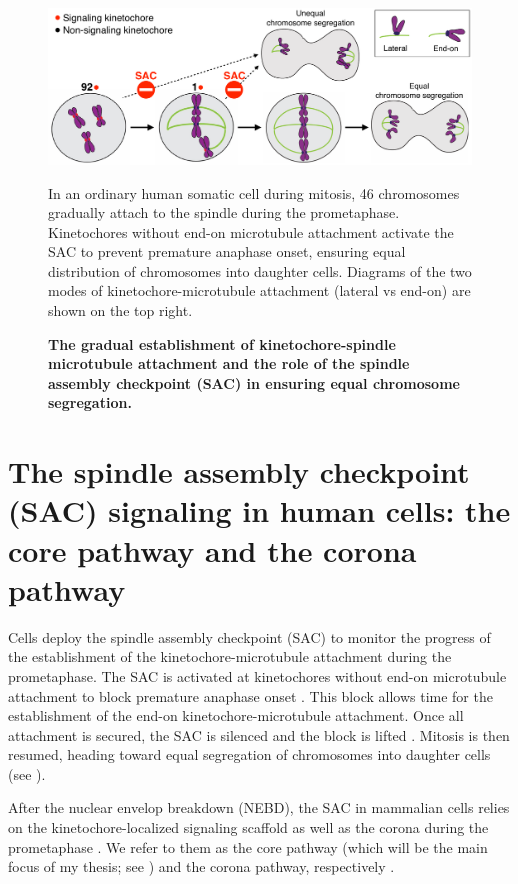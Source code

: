 \begin{figure}
    \centering
    \includegraphics[width=\textwidth]{chapters/figures/SACRole.pdf}
    \caption{\textbf{The gradual establishment of kinetochore-spindle microtubule attachment and the role of the spindle assembly checkpoint (SAC) in ensuring equal chromosome segregation.}}
    \noindent\justifying In an ordinary human somatic cell during mitosis, 46 chromosomes gradually attach to the spindle during the prometaphase. Kinetochores without end-on microtubule attachment activate the SAC to prevent premature anaphase onset, ensuring equal distribution of chromosomes into daughter cells. Diagrams of the two modes of kinetochore-microtubule attachment (lateral vs end-on) are shown on the top right.
    \label{SACRole}
\end{figure}

\section{The spindle assembly checkpoint (SAC) signaling in human cells: the core pathway and the corona pathway}
\label{TwoSACPathwaysIntro}

Cells deploy the spindle assembly checkpoint (SAC) to monitor the progress of the establishment of the kinetochore-microtubule attachment during the prometaphase. The SAC is activated at kinetochores without end-on microtubule attachment to block premature anaphase onset \cite{GSK923295MonastrolCotreatment, GSK923295LateralAttachmentEM, LateralAttachmentSAC}. This block allows time for the establishment of the end-on kinetochore-microtubule attachment. Once all attachment is secured, the SAC is silenced and the block is lifted \cite{SACActivationAndSilencing}. Mitosis is then resumed, heading toward equal segregation of chromosomes into daughter cells (see ).

After the nuclear envelop breakdown (NEBD), the SAC in mammalian cells relies on the kinetochore-localized signaling scaffold  as well as the corona during the prometaphase \cite{GSK923295LateralAttachmentEM, LateralAttachmentSAC, CoronaActivatesSAC}. We refer to them as the core pathway (which will be the main focus of my thesis; see ) and the corona pathway, respectively \cite{RZZ-MAD1vsBUB1-MAD1_2015, eSAC}.

